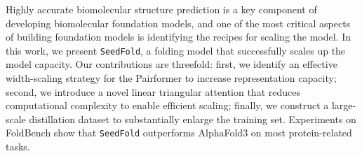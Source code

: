 Highly accurate biomolecular structure prediction is a key component of developing biomolecular foundation models, and one of the most critical aspects of building foundation models is identifying the recipes for scaling the model. In this work, we present \texttt{SeedFold}, a folding model that successfully scales up the model capacity. Our contributions are threefold: first, we identify an effective width-scaling strategy for the Pairformer to increase representation capacity; second, we introduce a novel linear triangular attention that reduces computational complexity to enable efficient scaling; finally, we construct a large-scale distillation dataset to substantially enlarge the training set. Experiments on FoldBench show that \texttt{SeedFold} outperforms AlphaFold3 on most protein-related tasks.